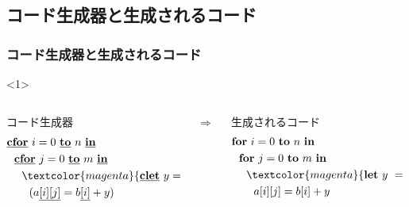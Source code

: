 \documentclass[dvipdfmx,cjk,xcolor=dvipsnames,envcountsect,notheorems,12pt]{beamer}
\newcommand\cLet{\underline{\textbf{clet}}}
\newcommand\cIn{\underline{\textbf{in}}}
\newcommand\magenta[1]{\textcolor{magenta}{#1}}
\newcommand\forin[2]{\textbf{for}~{#1}~\textbf{to}~{#2}~\textbf{in}}
\newcommand\cforin[2]{\underline{\textbf{cfor}}~{#1}~\underline{\textbf{to}}~{#2}~\underline{\textbf{in}}}
\newcommand\Let{\textbf{let}}
\newcommand\In{\textbf{in}}
\newcommand\cArray[1]{\underline{[{#1}]}}
\newcommand\cArrays[2]{\underline{[{#1}][{#2}]}}
\theoremstyle{definition}
\begin{document}
\subsection{コード生成器と生成されるコード}
\begin{frame}
  \frametitle{コード生成器と生成されるコード}
  \begin{onlyenv}<1>
    \begin{columns}
      \begin{column}{0.5\textwidth}%
        コード生成器
        \begin{align*}
          & \cforin{i = 0}{n} \\
          & ~~\cforin{j = 0}{m} \\
          & ~~~~\magenta{\cLet~y=t~\cIn} \\
          & ~~~~~~(a\cArrays{i}{j} = b\cArray{i} + y)
        \end{align*}
      \end{column}
      $\Rightarrow$
      \begin{column}{0.5\textwidth}%
        生成されるコード
        \begin{align*}
          & \forin{i = 0}{n} \\
          & ~~\forin{j = 0}{m} \\
          & ~~~~\magenta{\Let ~y ~= ~t ~\In} \\
          & ~~~~~~a[i][j] = b[i] + y \\
        \end{align*}
      \end{column}
    \end{columns}
  \end{onlyenv}


\end{frame}
\end{document}
